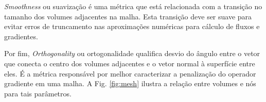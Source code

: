 \textit{Smoothness} ou suavização é uma métrica que está relacionada com a transição no tamanho dos volumes adjacentes na malha. Esta transição deve ser suave para evitar erros de truncamento nas aproximações numéricas para cálculo de fluxos e gradientes.

Por fim, \textit{Orthogonality} ou ortogonalidade qualifica desvio do ângulo entre o vetor que conecta o centro dos volumes adjacentes e o vetor normal à superfície entre eles. É a métrica responsável por melhor caracterizar a penalização do operador gradiente em uma malha.
A Fig. \ref{fig:mesh} ilustra a relação entre volumes e nós para tais parâmetros.




